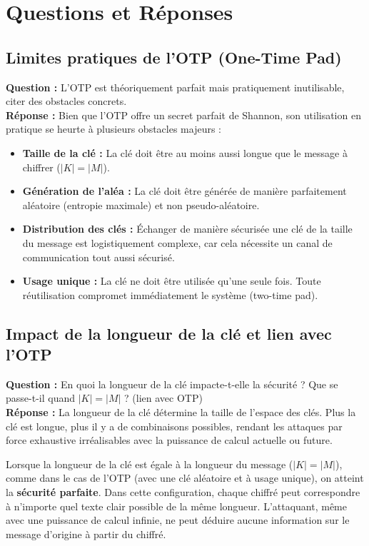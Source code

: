 \documentclass[12pt,a4paper]{report}
\begin{document}
\chapter{Questions et Réponses}

\section{Limites pratiques de l'OTP (One-Time Pad)}
\textbf{Question :} L'OTP est théoriquement parfait mais pratiquement inutilisable, citer des obstacles concrets.\\
\textbf{Réponse :}
Bien que l'OTP offre un secret parfait de Shannon, son utilisation en pratique se heurte à plusieurs obstacles majeurs :
\begin{itemize}
    \item \textbf{Taille de la clé :} La clé doit être au moins aussi longue que le message à chiffrer ($|K| = |M|$).
    \item \textbf{Génération de l'aléa :} La clé doit être générée de manière parfaitement aléatoire (entropie maximale) et non pseudo-aléatoire.
    \item \textbf{Distribution des clés :} Échanger de manière sécurisée une clé de la taille du message est logistiquement complexe, car cela nécessite un canal de communication tout aussi sécurisé.
    \item \textbf{Usage unique :} La clé ne doit être utilisée qu'une seule fois. Toute réutilisation compromet immédiatement le système (two-time pad).
\end{itemize}

\section{Impact de la longueur de la clé et lien avec l'OTP}
\textbf{Question :} En quoi la longueur de la clé impacte-t-elle la sécurité ? Que se passe-t-il quand $|K| = |M|$ ? (lien avec OTP)\\
\textbf{Réponse :}
La longueur de la clé détermine la taille de l'espace des clés. Plus la clé est longue, plus il y a de combinaisons possibles, rendant les attaques par force exhaustive irréalisables avec la puissance de calcul actuelle ou future.

Lorsque la longueur de la clé est égale à la longueur du message ($|K| = |M|$), comme dans le cas de l'OTP (avec une clé aléatoire et à usage unique), on atteint la \textbf{sécurité parfaite}. Dans cette configuration, chaque chiffré peut correspondre à n'importe quel texte clair possible de la même longueur. L'attaquant, même avec une puissance de calcul infinie, ne peut déduire aucune information sur le message d'origine à partir du chiffré.
\end{document}
